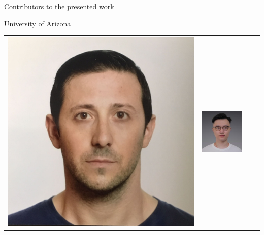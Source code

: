 \documentclass[14pt]{beamer}
\begin{document}
\begin{frame}{Contributors to the presented work}
\centering

\begin{block}{University of Arizona}
\begin{tabular}{c c c c }
\includegraphics[height=0.2\textheight]{Egoitz.jpg} &
\includegraphics[height=0.2\textheight]{Xin.jpg} &

\end{tabular}
\end{block}
\end{frame}
\end{document}
